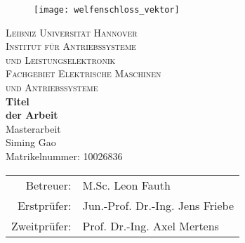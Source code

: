 \begin{titlepage}
\enlargethispage{2.0cm}

\begin{center}

\vspace*{-2cm}


   \begin{figure}[h]
   \centering
       \texttt{[image: welfenschloss\_vektor]}
   \end{figure}

\vspace{1cm}

    {\LARGE \textsc{Leibniz Universität Hannover}}\\[1.0cm]

    {\Large \textsc{Institut für Antriebssysteme}} \\[0.2cm]
    {\Large \textsc{und Leistungselektronik}} \\ [0.4cm]

    {\Large \textsc{Fachgebiet Elektrische Maschinen}} \\ [0.2cm]
		{\Large \textsc{und Antriebssysteme}} \\ [1.7cm]

    {\Large \textbf{Titel \\[0.3cm] der Arbeit} } \\ [3cm]

    {\Large Masterarbeit} \\ [1.5cm]

    {\large Siming Gao} \\
    {Matrikelnummer: 10026836 } \\ [1.5cm]

    \begin{tabular}{rl}
      Betreuer:    & M.Sc. Leon Fauth\\
      Erstprüfer:  & Jun.-Prof. Dr.-Ing. Jens Friebe\\
      Zweitprüfer: & Prof. Dr.-Ing. Axel Mertens
    \end{tabular}

\end{center}

\end{titlepage}
